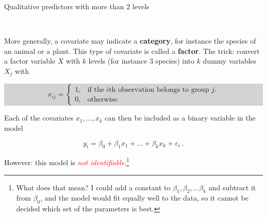 \documentclass[10pt,ignorenonframetext,]{beamer}
\begin{document}
\begin{frame}

\begin{block}{Qualitative predictors with more than 2 levels}

\(~\)

More generally, a covariate may indicate a \textbf{category}, for
instance the species of an animal or a plant. This type of covariate is
called a \textbf{factor}. The trick: convert a factor variable \(X\)
with \(k\) levels (for instance 3 species) into \(k\) dummy variables
\(X_j\) with \vspace{2mm}

\colorbox{lightgray}{\begin{minipage}{10cm}
\vspace{-0mm}
\begin{equation*}
x_{ij} = \left\{ 
\begin{array} {ll}
1, & \text{if the $i$th observation belongs to group $j$}.\\
0, & \text{otherwise.}
\end{array}\right.
\end{equation*}
\end{minipage}}

\vspace{4mm}

Each of the covariates \(x_1,\ldots, x_k\) can then be included as a
binary variable in the model

\begin{equation*}
y_i = \beta_0 + \beta_1 x_1 + \ldots + \beta_k x_k + \varepsilon_i \ .
\end{equation*}

\vspace{6mm} However: this model is
\emph{\textcolor{red}{not identifiable}}.\footnote{What does that mean? I could add a constant to $\beta_1, \beta_2, ...\beta_k$ and subtract it from $\beta_0$, and the model would fit equally well to the data, so it cannot be decided which set of the parameters is best.}

\end{block}

\end{frame}
\end{document}
